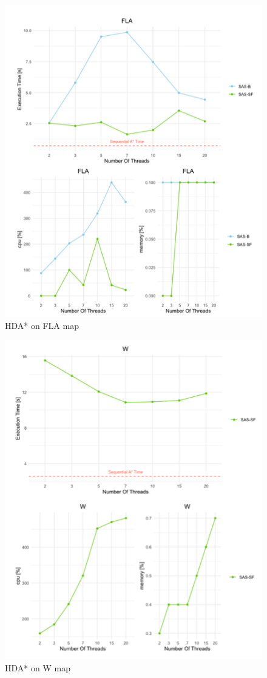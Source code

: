 \documentclass[twocolumn, switch]{article} %
\begin{document}
\begin{figure}[ht!]
  \centering
  \includegraphics[width=1\linewidth]{hda/fla.png}
  \caption{HDA* on FLA map}
  \label{hdafla}
\end{figure}
\begin{figure}[ht!]
  \centering
  \includegraphics[width=1\linewidth]{hda/w.png}
  \caption{HDA* on W map}
  \label{hdaw}
\end{figure}
\end{document}
